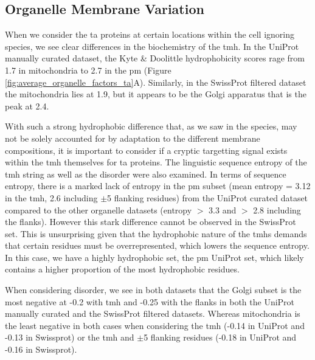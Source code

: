 \subsection{Organelle Membrane Variation}

When we consider the \gls{ta} proteins at certain locations within the cell ignoring species, we see clear differences in the biochemistry of the \gls{tmh}.
In the UniProt manually curated dataset, the Kyte \& Doolittle hydrophobicity scores rage from 1.7 in mitochondria to 2.7 in the \gls{pm} (Figure \ref{fig:average_organelle_factors_ta}A).
Similarly, in the SwissProt filtered dataset the mitochondria lies at 1.9, but it appears to be the Golgi apparatus that is the peak at 2.4.

With such a strong hydrophobic difference that, as we saw in the species, may not be solely accounted for by adaptation to the different membrane compositions, it is important to consider if a cryptic targetting signal exists within the \gls{tmh} themselves for \gls{ta} proteins.
The linguistic sequence entropy of the \gls{tmh} string as well as the disorder were also examined.
In terms of sequence entropy, there is a marked lack of entropy in the \gls{pm} subset (mean entropy = 3.12 in the \gls{tmh}, 2.6 including $\pm$5 flanking residues) from the UniProt curated dataset compared to the other organelle datasets (entropy $>$ 3.3 and $>$ 2.8 including the flanks).
However this stark difference cannot be observed in the SwissProt set.
This is unsurprising given that the hydrophobic nature of the \gls{tmh}s demands that certain residues must be overrepresented, which lowers the sequence entropy.
In this case, we have a highly hydrophobic set, the \gls{pm} UniProt set, which likely contains a higher proportion of the most hydrophobic residues.

When considering disorder, we see in both datasets that the Golgi subset is the most negative at -0.2 with \gls{tmh} and -0.25 with the flanks in both the UniProt manually curated and the SwissProt filtered datasets.
Whereas mitochondria is the least negative in both cases when considering the \gls{tmh} (-0.14 in UniProt and -0.13 in Swissprot) or the \gls{tmh} and $\pm$5 flanking residues (-0.18 in UniProt and -0.16 in Swissprot).

